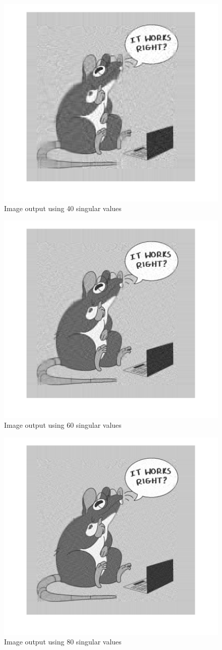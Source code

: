\begin{figure}[h]
    \centering
    \includegraphics[width=0.5\linewidth]{figs/40_s_v.png}
    \caption{Image output using 40 singular values}
    \label{fig:40_s}
\end{figure}
\begin{figure}[h]
    \centering
    \includegraphics[width=0.5\linewidth]{figs/60_s_v.png}
    \caption{Image output using 60 singular values}
    \label{fig:60_s}
\end{figure}
\begin{figure}[h]
    \centering
    \includegraphics[width=0.5\linewidth]{figs/80_s_v.png}
    \caption{Image output using 80 singular values}
    \label{fig:80_s}
\end{figure}

